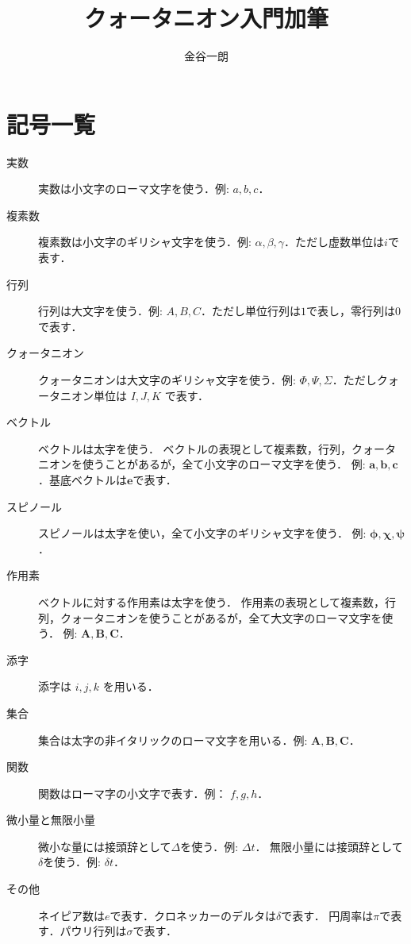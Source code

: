 \documentclass{jsbook}
\title{クォータニオン入門加筆}
\author{金谷一朗}
\newcommand{\bvec}[1]{\boldsymbol{#1}}
\newcommand{\bop}[1]{\boldsymbol{#1}}
\newcommand{\bg}[1]{\mathbf{#1}}
\newcommand{\ii}{I}%
\newcommand{\jj}{J}%
\newcommand{\kk}{K}%
\newcommand{\Zero}{0}%
\newcommand{\One}{1}%
\newcommand{\im}{i}%
\newcommand{\ve}{\bvec{e}}
\newcommand{\verysmall}{\varDelta}
\newcommand{\inftysmall}{\delta}
\begin{document}
\setlength{\baselineskip}{17pt}

\maketitle
\tableofcontents

\chapter*{記号一覧}

\begin{description}
\item[実数] 実数は小文字のローマ文字を使う．例: $a,b,c$．
\item[複素数] 複素数は小文字のギリシャ文字を使う．例: $\alpha,\beta,\gamma$．ただし虚数単位は$\im$で表す．
\item[行列] 行列は大文字を使う．例: $A,B,C$．ただし単位行列は$\One$で表し，零行列は$\Zero$で表す．
\item[クォータニオン] クォータニオンは大文字のギリシャ文字を使う．例: $\varPhi,\varPsi,\varSigma$．ただしクォータニオン単位は $\ii,\jj,\kk$ で表す．
\item[ベクトル] ベクトルは太字を使う．
ベクトルの表現として複素数，行列，クォータニオンを使うことがあるが，全て小文字のローマ文字を使う．
例: $\bvec{a},\bvec{b},\bvec{c}$．基底ベクトルは$\ve$で表す．
\item[スピノール] スピノールは太字を使い，全て小文字のギリシャ文字を使う．
例: $\bvec{\phi},\bvec{\chi},\bvec{\psi}$．
\item[作用素] ベクトルに対する作用素は太字を使う．
作用素の表現として複素数，行列，クォータニオンを使うことがあるが，全て大文字のローマ文字を使う．
例: $\bop{A},\bop{B},\bop{C}$．
\item[添字] 添字は $i,j,k$ を用いる．
\item[集合] 集合は太字の非イタリックのローマ文字を用いる．例: $\bg{A},\bg{B},\bg{C}$．
\item[関数] 関数はローマ字の小文字で表す．例： $f,g,h$．
\item[微小量と無限小量] 微小な量には接頭辞として$\verysmall$を使う．例: $\verysmall t$．
無限小量には接頭辞として$\inftysmall$を使う．例: $\inftysmall t$．
\item[その他] ネイピア数は$e$で表す．クロネッカーのデルタは$\delta$で表す．
円周率は$\pi$で表す．パウリ行列は$\sigma$で表す．
\end{description}



\setcounter{chapter}{-1}
\end{document}
